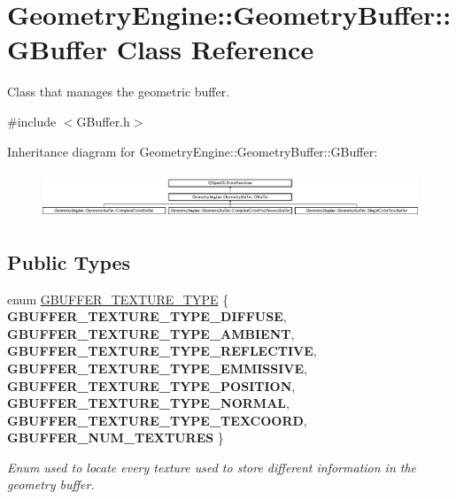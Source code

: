\hypertarget{class_geometry_engine_1_1_geometry_buffer_1_1_g_buffer}{}\section{Geometry\+Engine\+::Geometry\+Buffer\+::G\+Buffer Class Reference}
\label{class_geometry_engine_1_1_geometry_buffer_1_1_g_buffer}


Class that manages the geometric buffer.  




{\ttfamily \#include $<$G\+Buffer.\+h$>$}

Inheritance diagram for Geometry\+Engine\+::Geometry\+Buffer\+::G\+Buffer\+:\begin{figure}[H]
\begin{center}
\leavevmode
\includegraphics[height=1.393035cm]{class_geometry_engine_1_1_geometry_buffer_1_1_g_buffer}
\end{center}
\end{figure}
\subsection*{Public Types}
\begin{DoxyCompactItemize}
\item 
\mbox{\label{class_geometry_engine_1_1_geometry_buffer_1_1_g_buffer_a718dceafcac1915f7de061108597e1cc}} 
enum \mbox{\hyperlink{class_geometry_engine_1_1_geometry_buffer_1_1_g_buffer_a718dceafcac1915f7de061108597e1cc}{G\+B\+U\+F\+F\+E\+R\+\_\+\+T\+E\+X\+T\+U\+R\+E\+\_\+\+T\+Y\+PE}} \{ \newline
{\bfseries G\+B\+U\+F\+F\+E\+R\+\_\+\+T\+E\+X\+T\+U\+R\+E\+\_\+\+T\+Y\+P\+E\+\_\+\+D\+I\+F\+F\+U\+SE}, 
{\bfseries G\+B\+U\+F\+F\+E\+R\+\_\+\+T\+E\+X\+T\+U\+R\+E\+\_\+\+T\+Y\+P\+E\+\_\+\+A\+M\+B\+I\+E\+NT}, 
{\bfseries G\+B\+U\+F\+F\+E\+R\+\_\+\+T\+E\+X\+T\+U\+R\+E\+\_\+\+T\+Y\+P\+E\+\_\+\+R\+E\+F\+L\+E\+C\+T\+I\+VE}, 
{\bfseries G\+B\+U\+F\+F\+E\+R\+\_\+\+T\+E\+X\+T\+U\+R\+E\+\_\+\+T\+Y\+P\+E\+\_\+\+E\+M\+M\+I\+S\+S\+I\+VE}, 
\newline
{\bfseries G\+B\+U\+F\+F\+E\+R\+\_\+\+T\+E\+X\+T\+U\+R\+E\+\_\+\+T\+Y\+P\+E\+\_\+\+P\+O\+S\+I\+T\+I\+ON}, 
{\bfseries G\+B\+U\+F\+F\+E\+R\+\_\+\+T\+E\+X\+T\+U\+R\+E\+\_\+\+T\+Y\+P\+E\+\_\+\+N\+O\+R\+M\+AL}, 
{\bfseries G\+B\+U\+F\+F\+E\+R\+\_\+\+T\+E\+X\+T\+U\+R\+E\+\_\+\+T\+Y\+P\+E\+\_\+\+T\+E\+X\+C\+O\+O\+RD}, 
{\bfseries G\+B\+U\+F\+F\+E\+R\+\_\+\+N\+U\+M\+\_\+\+T\+E\+X\+T\+U\+R\+ES}
 \}
\begin{DoxyCompactList}\small\item\em Enum used to locate every texture used to store different information in the geometry buffer. \end{DoxyCompactList}\end{DoxyCompactItemize}

